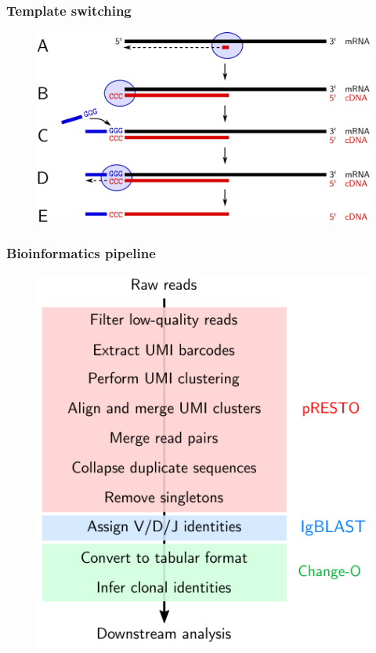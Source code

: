 \documentclass[presentation]{beamer}
\newlength{\slideheight}
\begin{document}
\begin{frame}
\frametitle{Template switching}
\begin{figure}
\includegraphics[height=0.9\slideheight]{figs/pdf/extra/template-switch}
\end{figure}
\end{frame}

\begin{frame}
\frametitle{Bioinformatics pipeline}
\begin{figure}
\includegraphics[height=\slideheight]{figs/pdf/immcantation-pipeline}
\end{figure}
\end{frame}
\end{document}
